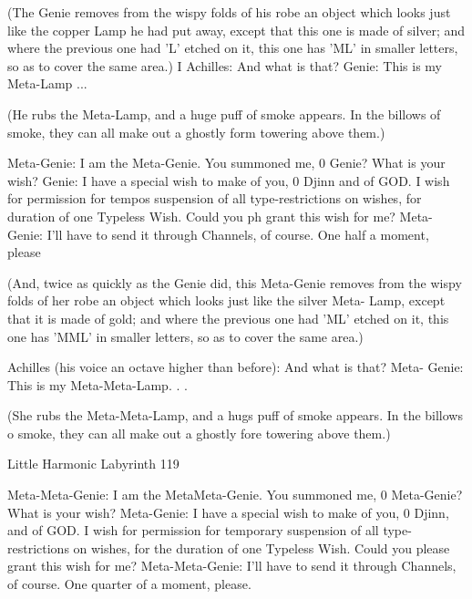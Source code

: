             (The Genie removes from the wispy folds of his robe an object which looks
             just like the copper Lamp he had put away, except that this one is made of
             silver; and where the previous one had 'L' etched on it, this one has 'ML' in
             smaller letters, so as to cover the same area.)
          I
          Achilles: And what is that?
          Genie: This is my Meta-Lamp ...

             (He rubs the Meta-Lamp, and a huge puff of smoke appears. In the billows
             of smoke, they can all make out a ghostly form towering above them.)

          Meta-Genie: I am the Meta-Genie. You summoned me, 0 Genie? What is
                 your wish?
          Genie: I have a special wish to make of you, 0 Djinn and of GOD. I wish for
                 permission for tempos suspension of all type-restrictions on wishes,
                 for duration of one Typeless Wish. Could you ph grant this wish for
                 me?
          Meta-Genie: I'll have to send it through Channels, of course. One half a
                 moment, please

             (And, twice as quickly as the Genie did, this Meta-Genie removes from the
             wispy folds of her robe an object which looks just like the silver Meta-
             Lamp, except that it is made of gold; and where the previous one had 'ML'
             etched on it, this one has 'MML' in smaller letters, so as to cover the same
             area.)

          Achilles (his voice an octave higher than before): And what is that? Meta-
                 Genie: This is my Meta-Meta-Lamp. . .

             (She rubs the Meta-Meta-Lamp, and a hugs puff of smoke appears. In the
             billows o smoke, they can all make out a ghostly fore towering above
             them.)




Little Harmonic Labyrinth                                                             119

            Meta-Meta-Genie: I am the MetaMeta-Genie. You summoned me,
          0 Meta-Genie? What is your wish?
          Meta-Genie: I have a special wish to make of you, 0 Djinn, and of GOD. I
                 wish for permission for temporary suspension of all type-restrictions
                 on wishes, for the duration of one Typeless Wish. Could you please
                 grant this wish for me?
                   Meta-Meta-Genie: I'll have to send it through Channels, of course.
                            One quarter of a moment, please.


